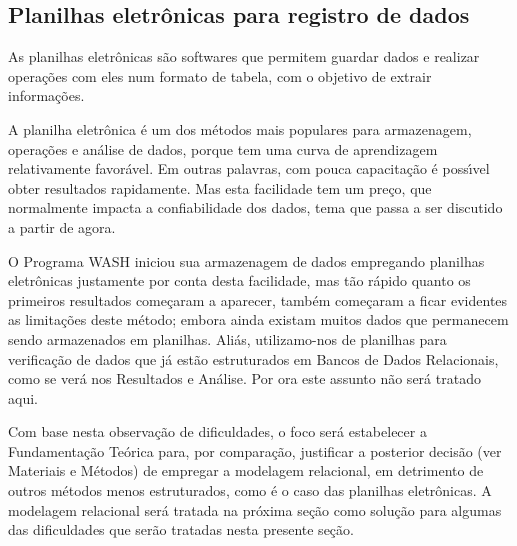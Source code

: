 \documentclass[
12pt,		%
openright,	%
twoside,  %
a4paper,			%
chapter=TITLE,		%
english,			%
french,				%
spanish,			%
brazil				%
]{USPSC-classe/USPSC}
\begin{document}
\subsection[Planilhas eletr\^onicas para registro de dados]{Planilhas eletr\^onicas para registro de dados}\label{Planilhas eletr\^onicas para registro de dados}
As planilhas eletr\^onicas s\~ao softwares que permitem guardar dados e realizar opera\c{c}\~oes com eles num formato de tabela, com o objetivo de  extrair informa\c{c}\~oes.








A planilha eletr\^onica \'e um dos m\'etodos mais populares para armazenagem, opera\c{c}\~oes e an\'alise de dados, porque tem uma curva de aprendizagem relativamente favor\'avel. Em outras palavras, com pouca capacita\c{c}\~ao \'e poss\'{\i}vel obter resultados rapidamente. Mas esta facilidade tem um pre\c{c}o, que normalmente impacta a confiabilidade dos dados, tema que passa a ser discutido a partir de agora.








O Programa WASH iniciou sua armazenagem de dados empregando planilhas eletr\^onicas justamente por conta desta facilidade, mas t\~ao r\'apido quanto os primeiros resultados come\c{c}aram a aparecer, tamb\'em come\c{c}aram a ficar evidentes as limita\c{c}\~oes deste m\'etodo; embora ainda existam muitos dados que permanecem sendo armazenados em planilhas. Ali\'as, utilizamo-nos de planilhas para verifica\c{c}\~ao de dados que j\'a est\~ao estruturados em Bancos de Dados Relacionais, como se ver\'a nos Resultados e An\'alise. Por ora este assunto n\~ao ser\'a tratado aqui.








Com base nesta observa\c{c}\~ao de dificuldades, o foco  ser\'a estabelecer a Fundamenta\c{c}\~ao Te\'orica para, por compara\c{c}\~ao, justificar a posterior decis\~ao (ver Materiais e M\'etodos) de empregar a modelagem relacional, em detrimento de outros m\'etodos menos estruturados, como \'e o caso das planilhas eletr\^onicas. A modelagem relacional ser\'a tratada na pr\'oxima se\c{c}\~ao como solu\c{c}\~ao para algumas das dificuldades que ser\~ao tratadas nesta presente se\c{c}\~ao.
\end{document}
